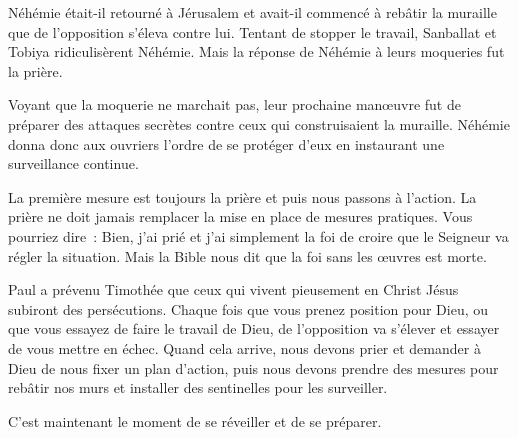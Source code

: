 


 Néhémie était-il retourné à Jérusalem
 et avait-il commencé à rebâtir la muraille que de l'opposition
 s'éleva contre lui.
 Tentant de stopper le travail, Sanballat et Tobiya ridiculisèrent Néhémie.
 Mais la réponse de Néhémie à leurs moqueries fut la prière.

Voyant que la moquerie ne marchait pas, leur prochaine manœuvre
 fut de préparer des attaques secrètes contre ceux qui construisaient
 la muraille.
 Néhémie donna donc aux ouvriers l'ordre de se protéger d'eux en instaurant
 une surveillance continue.

La première mesure est toujours la prière \ocadr{}et puis nous passons à l'action.
 La prière ne doit jamais remplacer la mise en place de mesures pratiques.
 Vous pourriez dire~:
 \og Bien, j'ai prié et j'ai simplement la foi de croire que le Seigneur
 va régler la situation. \fg{}
 Mais la Bible nous dit que la foi sans les œuvres est morte.


Paul a prévenu Timothée que ceux qui vivent pieusement en Christ Jésus
 subiront des persécutions.
 Chaque fois que vous prenez position pour Dieu,
 ou que vous essayez de faire le travail de Dieu,
 de l'opposition va s'élever et essayer de vous mettre en échec.
 Quand cela arrive, nous devons prier et demander à Dieu de nous fixer
 un plan d'action, puis nous devons prendre des mesures pour rebâtir
 nos murs et installer des sentinelles pour les surveiller.

C'est maintenant le moment de se réveiller et de se préparer. 


\dvrule






